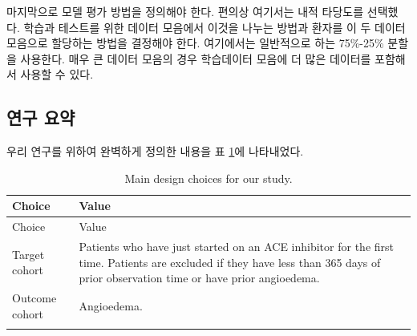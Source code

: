 \documentclass[10.5pt]{book}
\theoremstyle{definition}
\theoremstyle{definition}
\theoremstyle{definition}
\theoremstyle{remark}
\begin{document}
마지막으로 모델 평가 방법을 정의해야 한다. 편의상 여기서는 내적 타당도를
선택했다. 학습과 테스트를 위한 데이터 모음에서 이것을 나누는 방법과
환자를 이 두 데이터 모음으로 할당하는 방법을 결정해야 한다. 여기에서는
일반적으로 하는 75\%-25\% 분할을 사용한다. 매우 큰 데이터 모음의 경우
학습데이터 모음에 더 많은 데이터를 포함해서 사용할 수 있다.

\subsection{연구 요약}\label{--1}

우리 연구를 위하여 완벽하게 정의한 내용을 표 \ref{tab:plpSummary}에
나타내었다.

\begin{longtable}[]{@{}ll@{}}
\caption{\label{tab:plpSummary} Main design choices for our
study.}\tabularnewline
\toprule
\begin{minipage}[b]{0.23\columnwidth}\raggedright\strut
Choice\strut
\end{minipage} & \begin{minipage}[b]{0.71\columnwidth}\raggedright\strut
Value\strut
\end{minipage}\tabularnewline
\midrule
\endfirsthead
\toprule
\begin{minipage}[b]{0.23\columnwidth}\raggedright\strut
Choice\strut
\end{minipage} & \begin{minipage}[b]{0.71\columnwidth}\raggedright\strut
Value\strut
\end{minipage}\tabularnewline
\midrule
\endhead
\begin{minipage}[t]{0.23\columnwidth}\raggedright\strut
Target cohort\strut
\end{minipage} & \begin{minipage}[t]{0.71\columnwidth}\raggedright\strut
Patients who have just started on an ACE inhibitor for the first time.
Patients are excluded if they have less than 365 days of prior
observation time or have prior angioedema.\strut
\end{minipage}\tabularnewline
\begin{minipage}[t]{0.23\columnwidth}\raggedright\strut
Outcome cohort\strut
\end{minipage} & \begin{minipage}[t]{0.71\columnwidth}\raggedright\strut
Angioedema.\strut
\end{minipage}\tabularnewline
\begin{minipage}[t]{0.23\columnwidth}\raggedright\strut

\end{minipage}
\end{longtable}
\end{document}

